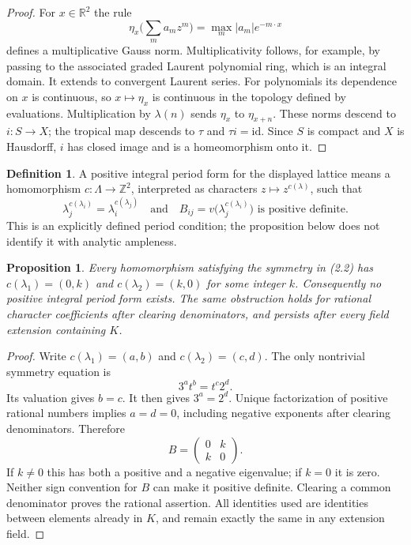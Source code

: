 \documentclass[11pt]{article}
\newtheorem{proposition}[theorem]{Proposition}
\theoremstyle{definition}\newtheorem{definition}[theorem]{Definition}
\newcommand{\R}{\mathbb R}
\newcommand{\Z}{\mathbb Z}
\begin{document}
\begin{proof}
For $x\in\R^2$ the rule
\[
 \eta_x\Big(\sum_m a_m z^m\Big)=\max_m |a_m|e^{-m\cdot x}
\]
defines a multiplicative Gauss norm. Multiplicativity follows, for example,
by passing to the associated graded Laurent polynomial ring, which is an
integral domain. It extends to convergent Laurent series. For polynomials
its dependence on $x$ is continuous, so $x\mapsto\eta_x$ is continuous in
the topology defined by evaluations. Multiplication by $\lambda(n)$ sends
$\eta_x$ to $\eta_{x+n}$. These norms descend to $i:S\to X$; the tropical
map descends to $\tau$ and $\tau i=\mathrm{id}$. Since $S$ is compact and
$X$ is Hausdorff, $i$ has closed image and is a homeomorphism onto it.
\end{proof}

\begin{definition}
A positive integral period form for the displayed lattice means a homomorphism
$c:\Lambda\to\Z^2$, interpreted as characters $z\mapsto z^{c(\lambda)}$,
such that
\[
 \lambda_j^{c(\lambda_i)}=\lambda_i^{c(\lambda_j)}
 \quad\text{and}\quad
 B_{ij}=v\big(\lambda_j^{c(\lambda_i)}\big)
 \text{ is positive definite}.
                                                               \tag{2.2}
\]
This is an explicitly defined period condition; the proposition below does
not identify it with analytic ampleness.
\end{definition}

\begin{proposition}\label{period}
Every homomorphism satisfying the symmetry in (2.2) has
$c(\lambda_1)=(0,k)$ and $c(\lambda_2)=(k,0)$ for some integer $k$.
Consequently no positive integral period form exists. The same obstruction
holds for rational character coefficients after clearing denominators, and
persists after every field extension containing $K$.
\end{proposition}
\begin{proof}
Write $c(\lambda_1)=(a,b)$ and $c(\lambda_2)=(c,d)$. The only nontrivial
symmetry equation is
\[
 3^a t^b=t^c2^d.
\]
Its valuation gives $b=c$. It then gives $3^a=2^d$. Unique factorization of
positive rational numbers implies $a=d=0$, including negative exponents
after clearing denominators. Therefore
\[
 B=\begin{pmatrix}0&k\\k&0\end{pmatrix}.
\]
If $k\ne0$ this has both a positive and a negative eigenvalue; if $k=0$ it
is zero. Neither sign convention for $B$ can make it positive definite.
Clearing a common denominator proves the rational assertion. All identities
used are identities between elements already in $K$, and remain exactly
the same in any extension field.
\end{proof}
\end{document}
